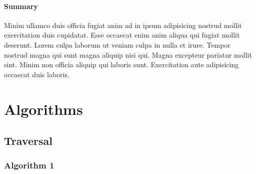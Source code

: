 \paragraph{Summary}
Minim ullamco duis officia fugiat anim ad in ipsum adipisicing nostrud mollit exercitation duis cupidatat. Esse occaecat enim anim aliqua qui fugiat mollit deserunt. Lorem culpa laborum ut veniam culpa in nulla et irure. Tempor nostrud magna qui sunt magna aliquip nisi qui. Magna excepteur pariatur mollit sint. Minim non officia aliquip qui laboris sunt. Exercitation aute adipisicing occaecat duis laboris.






\section{Algorithms}






\subsection{Traversal}


\subsubsection{Algorithm 1}

